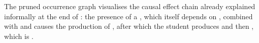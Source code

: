 The pruned occurrence graph visualises the causal effect chain already explained informally at the end of : the presence of a \ccoin, which itself depends on \am, combined with \cpowder and \nomilk causes the production of \espresso, after which the student produces \anger and then \bang, which is \Forbidden.

